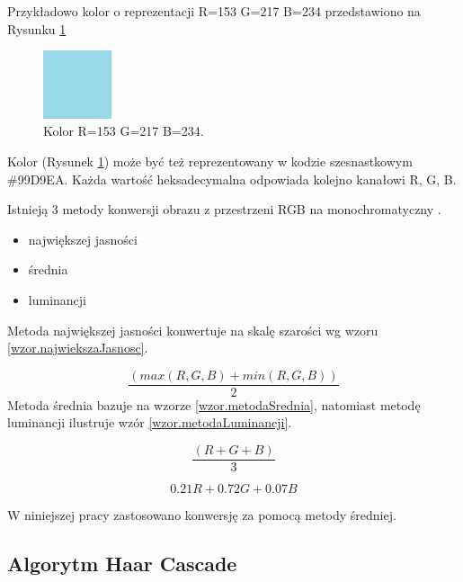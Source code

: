 \documentclass[a4paper,twoside,12pt]{book}
\begin{document}
    Przykładowo kolor o reprezentacji R=153 G=217 B=234 przedstawiono na Rysunku \ref{fig.mieszanieKolorowBlekitny}

    \begin{figure}
        \centering
        \includegraphics[width=2cm]{Obrazy/blekitny.jpg}
        \caption{Kolor R=153 G=217 B=234.}
        \label{fig.mieszanieKolorowBlekitny}
    \end{figure}

    Kolor (Rysunek \ref{fig.mieszanieKolorowBlekitny}) może być też reprezentowany w kodzie szesnastkowym \#99D9EA.
    Każda
    wartość heksadecymalna odpowiada kolejno kanałowi R, G, B.

    Istnieją 3 metody konwersji obrazu z przestrzeni RGB na monochromatyczny \cite{colorMixing}.
    \begin{itemize}
        \item największej jasności
        \item średnia
        \item luminancji
    \end{itemize}
    Metoda największej jasności konwertuje na skalę szarości wg wzoru \ref{wzor.najwiekszaJasnosc}.

    \large
    \begin{equation}
        \frac{(max(R, G, B) + min(R, G, B))}{2}
        \label{wzor.najwiekszaJasnosc}
    \end{equation}
    \normalsize
    Metoda średnia bazuje na wzorze \ref{wzor.metodaSrednia}, natomiast metodę luminancji ilustruje wzór
    \ref{wzor.metodaLuminancji}.

    \large
    \begin{equation}
        \frac{(R + G + B)}{3}
        \label{wzor.metodaSrednia}
    \end{equation}
    \normalsize

    \large
    \begin{equation}
        0.21 R + 0.72 G + 0.07 B
        \label{wzor.metodaLuminancji}
    \end{equation}
    \normalsize

    W niniejszej pracy zastosowano konwersję za pomocą metody średniej.
    \subsection{Algorytm Haar Cascade}\label{subsec:algorytm-haar-cascade}
\end{document}
